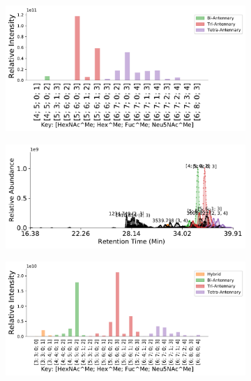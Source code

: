 \begin{figure}[tb]
\begin{minipage}{1\linewidth}
\begin{subfigure}[b]{0.49\linewidth}
                \subcaption{
                    \label{fig:agp_assignment:c}
                }
            \end{subfigure}
            \vspace{0pt}
            \begin{subfigure}[b]{0.49\linewidth}
                \includegraphics[width=1\linewidth, valign=b]{figure/dp_agp_abundances.pdf}
                \subcaption{
                    \label{fig:agp_assignment:d}
                }
            \end{subfigure}
        \end{minipage}
        \begin{minipage}{1\linewidth}
            \centering
            \begin{subfigure}[b]{0.49\linewidth}
                \includegraphics[width=1\linewidth, valign=t]{figure/rp_agp_chromatograms.pdf}
                \subcaption{
                    \label{fig:agp_assignment:e}
                }
            \end{subfigure}
            \vspace{0pt}
            \begin{subfigure}[b]{0.49\linewidth}
                \includegraphics[width=1\linewidth, valign=b]{figure/rp_agp_abundances.pdf}

\end{subfigure}
\end{minipage}
\end{figure}
